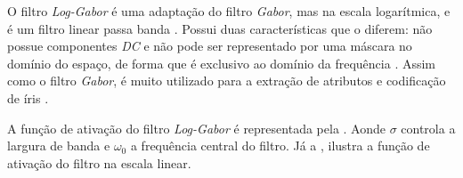 \par O filtro \textit{Log-Gabor} é uma adaptação do filtro \textit{Gabor}, mas na escala logarítmica, e é um filtro linear passa banda \cite{field1987-loggabor}. Possui duas características que o diferem: não possue componentes \textit{DC} e não pode ser representado por uma máscara no domínio do espaço, de forma que é exclusivo ao domínio da frequência \cite{loggabor-kovesi}. Assim como o filtro \textit{Gabor}, é muito utilizado para a extração de atributos e codificação de íris \cite{masek2003}.

\par A função de ativação do filtro \textit{Log-Gabor} é representada pela . Aonde $\sigma$ controla a largura de banda e $\omega_{0}$ a frequência central do filtro. Já a , ilustra a função de ativação do filtro na escala linear.




